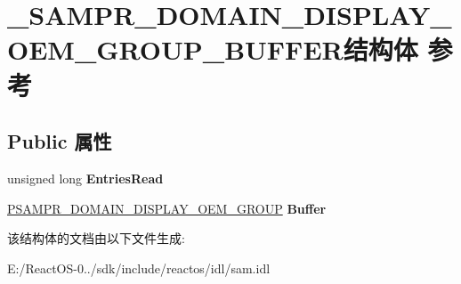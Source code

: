 \hypertarget{struct___s_a_m_p_r___d_o_m_a_i_n___d_i_s_p_l_a_y___o_e_m___g_r_o_u_p___b_u_f_f_e_r}{}\section{\+\_\+\+S\+A\+M\+P\+R\+\_\+\+D\+O\+M\+A\+I\+N\+\_\+\+D\+I\+S\+P\+L\+A\+Y\+\_\+\+O\+E\+M\+\_\+\+G\+R\+O\+U\+P\+\_\+\+B\+U\+F\+F\+E\+R结构体 参考}
\label{struct___s_a_m_p_r___d_o_m_a_i_n___d_i_s_p_l_a_y___o_e_m___g_r_o_u_p___b_u_f_f_e_r}
\subsection*{Public 属性}
\begin{DoxyCompactItemize}
\item 
\mbox{\label{struct___s_a_m_p_r___d_o_m_a_i_n___d_i_s_p_l_a_y___o_e_m___g_r_o_u_p___b_u_f_f_e_r_ae4019e66cd0604139ce9a3ff8d4195de}} 
unsigned long {\bfseries Entries\+Read}
\item 
\mbox{\label{struct___s_a_m_p_r___d_o_m_a_i_n___d_i_s_p_l_a_y___o_e_m___g_r_o_u_p___b_u_f_f_e_r_aa4f9886b3f9871b7f5f62c2ba3ed0775}} 
\hyperlink{struct___s_a_m_p_r___d_o_m_a_i_n___d_i_s_p_l_a_y___o_e_m___g_r_o_u_p}{P\+S\+A\+M\+P\+R\+\_\+\+D\+O\+M\+A\+I\+N\+\_\+\+D\+I\+S\+P\+L\+A\+Y\+\_\+\+O\+E\+M\+\_\+\+G\+R\+O\+UP} {\bfseries Buffer}
\end{DoxyCompactItemize}


该结构体的文档由以下文件生成\+:\begin{DoxyCompactItemize}
\item 
E\+:/\+React\+O\+S-\/0../sdk/include/reactos/idl/sam.\+idl\end{DoxyCompactItemize}
